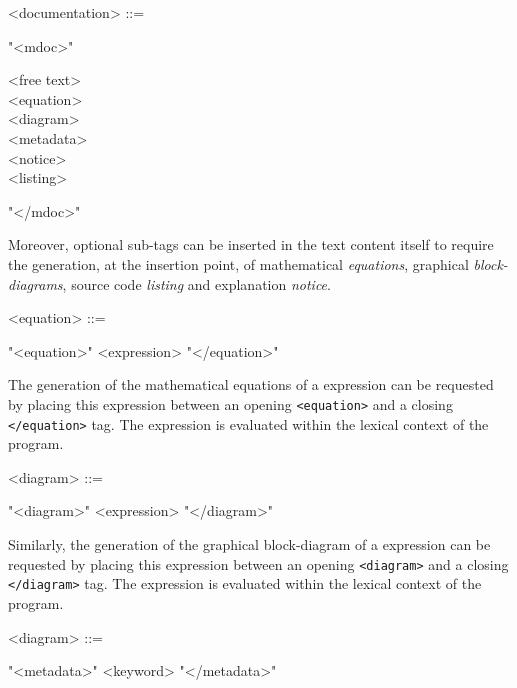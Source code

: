 \documentclass[a4paper,10pt]{book}
\begin{document}
\begin{grammar}
  <documentation> ::= 
  \begin{syntdiag}
    "<mdoc>"     
    \begin{stack}
      <free text>\\
      <equation>\\
      <diagram>\\
      <metadata>\\
      <notice>\\
      <listing>
    \end{stack}
    "</mdoc>"
  \end{syntdiag}
\end{grammar}

Moreover, optional sub-tags can be inserted in the text content itself to require the generation, at the insertion point, of mathematical \textit{equations}, graphical \textit{block-diagrams}, \faust source code \textit{listing} and explanation \textit{notice}.

\begin{grammar}
  <equation> ::= 
  \begin{syntdiag}
    "<equation>" <expression> "</equation>"
  \end{syntdiag}
\end{grammar}

The generation of the mathematical equations of a \faust expression can be requested by placing this expression between an opening \lstinline'<equation>' and a closing \lstinline'</equation>' tag. The expression is evaluated within the lexical context of the \faust program.

\begin{grammar}
  <diagram> ::= 
  \begin{syntdiag}
    "<diagram>" <expression> "</diagram>"
  \end{syntdiag}
\end{grammar}

Similarly, the generation of the graphical block-diagram of a \faust expression can be requested by placing this expression between an opening \lstinline'<diagram>' and a closing \lstinline'</diagram>' tag. The expression is evaluated within the lexical context of the \faust program.

\begin{grammar}
  <diagram> ::= 
  \begin{syntdiag}
    "<metadata>" <keyword> "</metadata>"
  \end{syntdiag}
\end{grammar}
\end{document}
